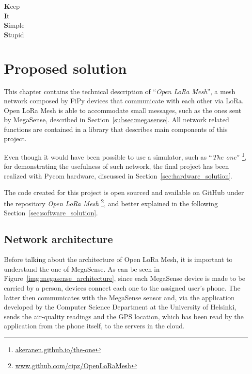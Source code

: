 
\begin{savequote}[40mm]
	\textbf{K}eep\\
	\textbf{I}t\\
	\textbf{S}imple\\
	\textbf{S}tupid
\end{savequote}

\chapter{Proposed solution}\label{chapter:proposed_solution}

	This chapter contains the technical description of ``\textit{Open LoRa Mesh}'', a mesh network composed by FiPy devices that communicate with each other via LoRa.
	Open LoRa Mesh is able to accommodate small messages, such as the ones sent by MegaSense, described in Section~\ref{subsec:megasense}.
	All network related functions are contained in a library that describes main components of this project.

	Even though it would have been possible to use a simulator, such as ``\textit{The one}'' \footnote{ \url{akeranen.github.io/the-one}}, for demonstrating the usefulness of such network, the final project has been realized with Pycom hardware, discussed in Section~\ref{sec:hardware_solution}.
	
	The code created for this project is open sourced and available on GitHub under the repository \textit{Open LoRa Mesh} \footnote{ \url{www.github.com/cipz/OpenLoRaMesh}}, and better explained in the following Section~\ref{sec:software_solution}.
	
	\section{Network architecture}\label{sec:architecture}
		
		Before talking about the architecture of Open LoRa Mesh, it is important to understand the one of MegaSense.
		As can be seen in Figure~\ref{img:megasense_architecture}, since each MegaSense device is made to be carried by a person, devices connect each one to the assigned user's phone.
		The latter then communicates with the MegaSense sensor and, via the application developed by the Computer Science Department at the University of Helsinki, sends the air-quality readings and the GPS location, which has been read by the application from the phone itself, to the servers in the cloud.
		
